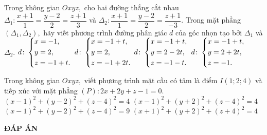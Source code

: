 \begin{ex}%
Trong không gian $Oxyz,$ cho hai đường thẳng cắt nhau $\Delta_1\colon \dfrac{x+1}1=\dfrac{y-2}2=\dfrac{z+1}3$ và $\Delta_2\colon \dfrac{x+1}1=\dfrac{y-2}2=\dfrac{z+1}{-3}.$ Trong mặt phẳng $(\Delta_1, \Delta_2),$ hãy viết phương trình đường phân giác $d$ của góc nhọn tạo bởi $\Delta_1$ và $\Delta_2.$
\def\dotEX{}\choice
	{\True $d\colon \left\{\begin{aligned}&x=-1,\\&y=2,\\&z=-1+t.\end{aligned}\right.$}
	{$d\colon \left\{\begin{aligned}&x=-1+t,\\&y=2,\\&z=-1+2t.\end{aligned}\right.$}
	{$d\colon \left\{\begin{aligned}&x=-1+t,\\&y=2-2t,\\&z=-1-t.\end{aligned}\right.$}
	{$d\colon \left\{\begin{aligned}&x=-1+t,\\&y=2+2t,\\&z=-1.\end{aligned}\right.$}
\end{ex}
\begin{ex}%
Trong không gian $Oxyz,$ viết phương trình mặt cầu có tâm là điểm $I(1; 2; 4)$ và tiếp xúc với mặt phẳng $(P)\colon 2x+2y+z-1=0.$
	\choice
	{$(x-1)^2+(y-2)^2+(z-4)^2=4$}
	{$(x-1)^2+(y+2)^2+(z-4)^2=4$}
	{\True $(x-1)^2+(y-2)^2+(z-4)^2=9$}
	{$(x+1)^2+(y+2)^2+(z+4)^2=4$}
\end{ex}
\newpage
\begin{center}
	\textbf{ĐÁP ÁN}
\end{center}
\begin{multicols}{10}
	 
\end{multicols}